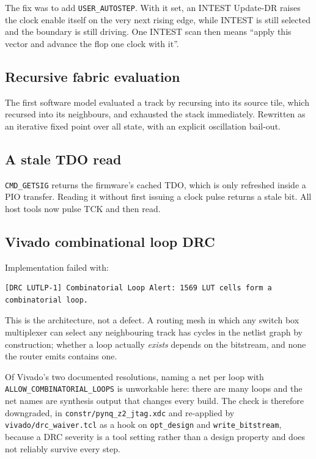 \documentclass[11pt,a4paper]{article}
\newcommand{\file}[1]{\texttt{#1}}
\begin{document}
The fix was to add \texttt{USER\_AUTOSTEP}. With it set, an INTEST Update-DR
raises the clock enable itself on the very next rising edge, while INTEST is
still selected and the boundary is still driving. One INTEST scan then means
``apply this vector and advance the flop one clock with it''.

\subsection{Recursive fabric evaluation}

The first software model evaluated a track by recursing into its source tile,
which recursed into its neighbours, and exhausted the stack immediately. Rewritten
as an iterative fixed point over all state, with an explicit oscillation bail-out.

\subsection{A stale TDO read}

\texttt{CMD\_GETSIG} returns the firmware's cached TDO, which is only refreshed
inside a PIO transfer. Reading it without first issuing a clock pulse returns a
stale bit. All host tools now pulse TCK and then read.

\subsection{Vivado combinational loop DRC}

Implementation failed with:

\begin{lstlisting}
[DRC LUTLP-1] Combinatorial Loop Alert: 1569 LUT cells form a combinatorial loop.
\end{lstlisting}

This is the architecture, not a defect. A routing mesh in which any switch box
multiplexer can select any neighbouring track has cycles in the netlist graph by
construction; whether a loop actually \emph{exists} depends on the bitstream,
and none the router emits contains one.

Of Vivado's two documented resolutions, naming a net per loop with
\texttt{ALLOW\_COMBINATORIAL\_LOOPS} is unworkable here: there are many loops and
the net names are synthesis output that changes every build. The check is
therefore downgraded, in \file{constr/pynq\_z2\_jtag.xdc} and re-applied by
\file{vivado/drc\_waiver.tcl} as a hook on \texttt{opt\_design} and
\texttt{write\_bitstream}, because a DRC severity is a tool setting rather than a
design property and does not reliably survive every step.
\end{document}
